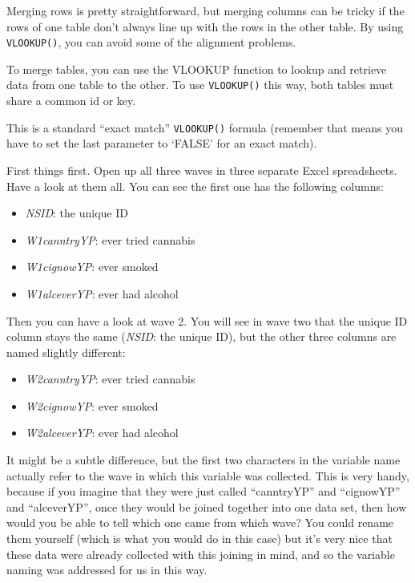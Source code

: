 \documentclass[
]{book}
\providecommand{\tightlist}{%
  \setlength{\itemsep}{0pt}\setlength{\parskip}{0pt}}
\begin{document}
Merging rows is pretty straightforward, but merging columns can be tricky if the rows of one table don't always line up with the rows in the other table. By using \texttt{VLOOKUP()}, you can avoid some of the alignment problems.

To merge tables, you can use the VLOOKUP function to lookup and retrieve data from one table to the other. To use \texttt{VLOOKUP()} this way, both tables must share a common id or key.

This is a standard ``exact match'' \texttt{VLOOKUP()} formula (remember that means you have to set the last parameter to `FALSE' for an exact match).

First things first. Open up all three waves in three separate Excel spreadsheets. Have a look at them all. You can see the first one has the following columns:

\begin{itemize}
\tightlist
\item
  \emph{NSID}: the unique ID
\item
  \emph{W1canntryYP}: ever tried cannabis\\
\item
  \emph{W1cignowYP}: ever smoked
\item
  \emph{W1alceverYP}: ever had alcohol
\end{itemize}

Then you can have a look at wave 2. You will see in wave two that the unique ID column stays the same (\emph{NSID}: the unique ID), but the other three columns are named slightly different:

\begin{itemize}
\tightlist
\item
  \emph{W2canntryYP}: ever tried cannabis\\
\item
  \emph{W2cignowYP}: ever smoked
\item
  \emph{W2alceverYP}: ever had alcohol
\end{itemize}

It might be a subtle difference, but the first two characters in the variable name actually refer to the wave in which this variable was collected. This is very handy, because if you imagine that they were just called ``canntryYP'' and ``cignowYP'' and ``alceverYP'', once they would be joined together into one data set, then how would you be able to tell which one came from which wave? You could rename them yourself (which is what you would do in this case) but it's very nice that these data were already collected with this joining in mind, and so the variable naming was addressed for us in this way.
\end{document}
